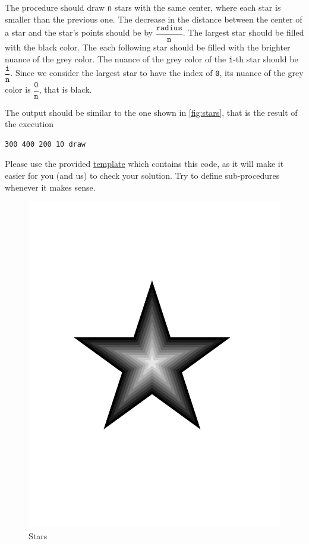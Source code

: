 \documentclass [11pt, a4wide, twoside]{article}
\begin{document}
The procedure should draw \texttt{n} stars with the same center, where each star is smaller than the previous one.
The decrease in the distance between the center of a star and the star's points should be by $\dfrac{\texttt{radius}}{\texttt{n}}$.
The largest star should be filled with the black color. 
The each following star should be filled with the brighter nuance of the grey color. The nuance of the grey color of the \mbox{\texttt{i}-th} star should be $\dfrac{\texttt{i}}{\texttt{n}}$. Since we consider the largest star to have the index of \texttt{0}, its nuance of the grey color is $\dfrac{\texttt{0}}{\texttt{n}}$, that is black.


The output should be similar to the one shown in \autoref{fig:stars}, that is the result of the execution 
\begin{verbatim}
300 400 200 10 draw
\end{verbatim}
Please use the provided \href{http://scg.unibe.ch/download/lectures/pl2018-exercises/Assignment02-stars-template.txt}{template} which contains this code, as it will make it easier for you (and us) to check your solution.
Try to define sub-procedures whenever it makes sense. 


\begin{figure}[h]
\begin{center}
\includegraphics[width=0.5\linewidth]{figs/star.pdf}
\caption{Stars}
\label{fig:stars}
\end{center}
\end{figure}
\end{document}
